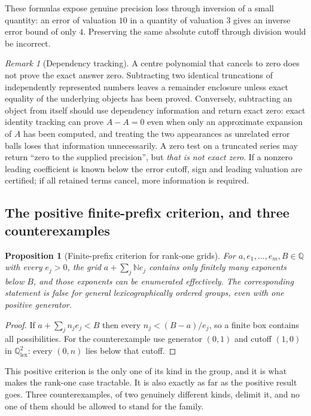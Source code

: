 \documentclass[11pt,letterpaper]{article}
\numberwithin{equation}{section}
\newtheorem{proposition}[theorem]{Proposition}
\theoremstyle{definition}
\theoremstyle{remark}
\newtheorem{remark}[theorem]{Remark}
\newcommand{\Q}{\mathbb Q}
\newcommand{\N}{\mathbb N}
\begin{document}
These formulas expose genuine precision loss through inversion of a small
quantity: an error of valuation $10$ in a quantity of valuation $3$ gives an
inverse error bound of only $4$. Preserving the same absolute cutoff through
division would be incorrect.

\begin{remark}[Dependency tracking]\label{cas:rem-dependency}
A centre polynomial that cancels to zero does not prove the exact answer zero.
Subtracting two identical truncations of independently represented numbers
leaves a remainder enclosure unless exact equality of the underlying objects has
been proved. Conversely, subtracting an object from itself should use dependency
information and return exact zero: exact identity tracking can prove $A-A=0$
even when only an approximate expansion of $A$ has been computed, and treating
the two appearances as unrelated error balls loses that information
unnecessarily. A zero test on a truncated series may return ``zero to the
supplied precision'', but \emph{that is not exact zero}. If a nonzero leading
coefficient is known below the error cutoff, sign and leading valuation are
certified; if all retained terms cancel, more information is required.
\end{remark}

\subsection{The positive finite-prefix criterion, and three counterexamples}
\label{cas:sub-finiteprefix}
\begin{proposition}[Finite-prefix criterion for rank-one grids]
\label{cas:prop-finiteprefix}
For $a,e_1,\dots,e_m,B\in\Q$ with every $e_j>0$, the grid $a+\sum_j\N e_j$
contains only finitely many exponents below $B$, and those exponents can be
enumerated effectively. The corresponding statement is false for general
lexicographically ordered groups, even with one positive generator.
\end{proposition}
\begin{proof}
If $a+\sum_jn_je_j<B$ then every $n_j<(B-a)/e_j$, so a finite box contains all
possibilities. For the counterexample use generator $(0,1)$ and cutoff $(1,0)$
in $\Q^2_{\mathrm{lex}}$: every $(0,n)$ lies below that cutoff.
\end{proof}

This positive criterion is the only one of its kind in the group, and it is what
makes the rank-one case tractable. It is also exactly as far as the positive
result goes. Three counterexamples, of two genuinely different kinds, delimit it,
and no one of them should be allowed to stand for the family.
\end{document}
